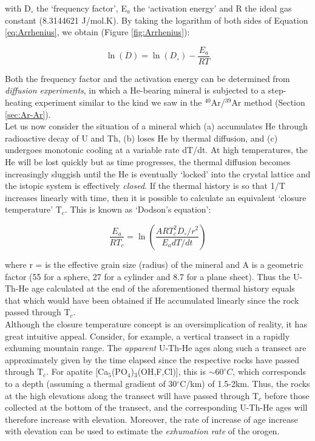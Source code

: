 \documentclass{book}
\begin{document}
with D$_\circ$ the `frequency factor', E$_a$ the `activation energy'
and R the ideal gas constant (8.3144621 J/mol.K). By taking the
logarithm of both sides of Equation \ref{eq:Arrhenius}, we obtain
(Figure \ref{fig:Arrhenius}):

\begin{equation}
\ln(D) = \ln(D_\circ) - \frac{E_a}{RT}
\label{eq:logD}
\end{equation}

Both the frequency factor and the activation energy can be determined
from \emph{diffusion experiments}, in which a He-bearing mineral is
subjected to a step-heating experiment similar to the kind we saw in
the $^{40}$Ar/$^{39}$Ar method (Section \ref{sec:Ar-Ar}).\\

Let us now consider the situation of a mineral which (a) accumulates
He through radioactive decay of U and Th, (b) loses He by thermal
diffusion, and (c) undergoes monotonic cooling at a variable rate
dT/dt. At high temperatures, the He will be lost quickly but as time
progresses, the thermal diffusion becomes increasingly sluggish until
the He is eventually `locked' into the crystal lattice and the istopic
system is effectively \emph{closed}. If the thermal history is so that
1/T increases linearly with time, then it is possible to calculate an
equivalent `closure temperature' T$_c$. This is known as `Dodson's
equation':

\begin{equation}
\frac{E_a}{RT_c} = \ln\left(\frac{ART_c^2D_\circ/r^2}{E_adT/dt}\right)
\label{eq:Tc}
\end{equation}

where r = is the effective grain size (radius) of the mineral and A is
a geometric factor (55 for a sphere, 27 for a cylinder and 8.7 for a
plane sheet). Thus the U-Th-He age calculated at the end of the
aforementioned thermal history equals that which would have been
obtained if He accumulated linearly since the rock passed through
T$_c$.\\

Although the closure temperature concept is an oversimplication of
reality, it has great intuitive appeal. Consider, for example, a
vertical transect in a rapidly exhuming mountain range. The
\emph{apparent} U-Th-He ages along such a transect are approximately
given by the time elapsed since the respective rocks have passed
through T$_c$. For apatite [Ca$_5$(PO$_4$)$_3$(OH,F,Cl)], this is
$\sim 60^{\circ}C$, which corresponds to a depth (assuming a thermal
gradient of 30$^{\circ}$C/km) of 1.5-2km. Thus, the rocks at the high
elevations along the transect will have passed through T$_c$ before
those collected at the bottom of the transect, and the corresponding
U-Th-He ages will therefore increase with elevation. Moreover, the
rate of increase of age increase with elevation can be used to
estimate the \emph{exhumation rate} of the orogen.
\end{document}

